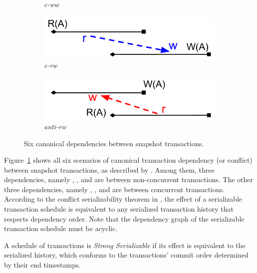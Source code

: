 \begin{figure}
\begin{subfigure}{0.45\textwidth}
      \caption{\textit{c-ww}}
  \end{subfigure}
  \begin{subfigure}{0.45\textwidth}
      \includegraphics[width=0.99\textwidth]{diagram/txn/dependency/theory_concurrent_rw.pdf} 
      \caption{\textit{c-rw}}
  \end{subfigure}
  \begin{subfigure}{0.45\textwidth}
      \includegraphics[width=0.99\textwidth]{diagram/txn/dependency/theory_concurrent_antirw.pdf} 
      \caption{\textit{anti-rw}}
  \end{subfigure}  
  \caption{Six canonical dependencies between snapshot transactions.}
  \label{diagram:txn:theory_dependencies}
\end{figure}

Figure~\ref{diagram:txn:theory_dependencies} shows all six scenarios of canonical transaction dependency (or conflict) between snapshot transactions, as described by
\cite{fekete2005making}.
%
Among them, three dependencies, namely , , and
 are between non-concurrent transactions.
%
The other three dependencies, namely , , and  are between concurrent transactions.
%
According to the conflict serializability theorem in
\cite{weikum2001transactional}, the effect of a serializable transaction
schedule is equivalent to any serialized transaction history that respects
dependency order.
%
Note that the dependency graph of the serializable transaction schedule must be acyclic.

\begin{definition}
  A schedule of transactions is \textit{Strong Serializable} if its effect is
  equivalent to the serialized history, which conforms to the transactions'
  commit order determined by their end timestamps.
\end{definition}

